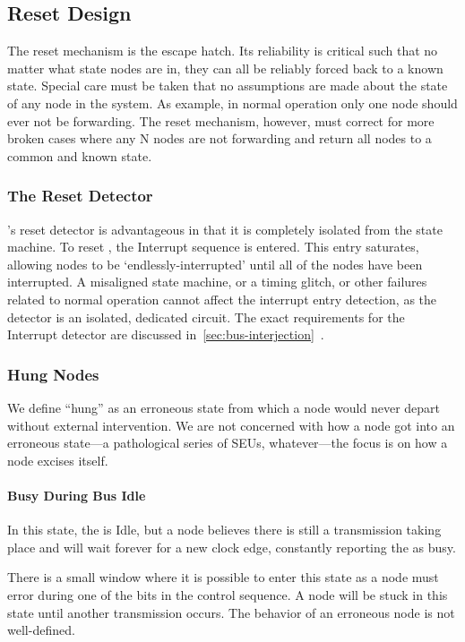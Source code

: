\subsection{Reset Design}
\label{sec:design-reset}
The reset mechanism is the \bus escape hatch. Its reliability is critical such
that no matter what state \bus nodes are in, they can all be reliably forced
back to a known state. Special care must be taken that no assumptions are made
about the state of any node in the system. As example, in normal operation
only one node should ever not be forwarding. The reset mechanism, however,
must correct for more broken cases where any N nodes are not forwarding and
return all nodes to a common and known state.

\subsubsection{The Reset Detector}
\bus's reset detector is advantageous in that it is completely isolated from
the \bus state machine. To reset \bus, the Interrupt sequence is entered. This
entry saturates, allowing nodes to be `endlessly-interrupted' until all of the
nodes have been interrupted. A misaligned state machine, or a timing glitch,
or other failures related to normal operation cannot affect the interrupt
entry detection, as the detector is an isolated, dedicated circuit. The exact
requirements for the Interrupt detector are discussed
in~\ref{sec:bus-interjection}~.

\subsubsection{Hung Nodes}
\label{sec:reset-hung}
We define ``hung'' as an erroneous state from which a node would never depart
without external intervention. We are not concerned with how a node got into
an erroneous state---a pathological series of SEUs, whatever---the focus is on
how a node excises itself.

\paragraph{Busy During Bus Idle}
In this state, the \bus is Idle, but a node believes there is still a
transmission taking place and will wait forever for a new clock edge,
constantly reporting the \bus as busy.

There is a small window where it is possible to enter this state as a node
must error during one of the bits in the control sequence. A node will be
stuck in this state until another transmission occurs. The behavior of an
erroneous node is not well-defined.

